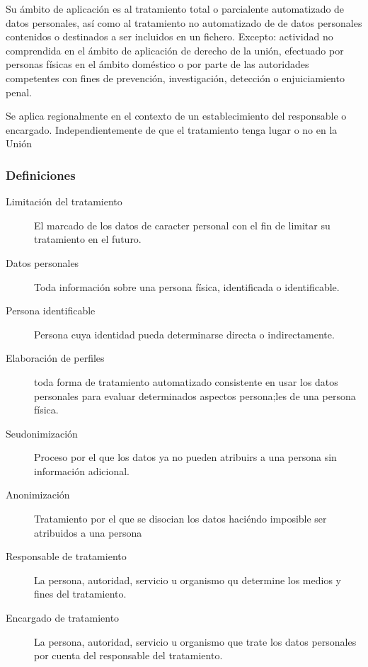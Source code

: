         Su ámbito de aplicación es al tratamiento total o parcialente automatizado de datos personales, así como al tratamiento no automatizado de de datos personales contenidos o destinados a ser incluidos en un fichero. Excepto: actividad no comprendida en el ámbito de aplicación de derecho de la unión, efectuado por personas físicas en el ámbito doméstico o por parte de las autoridades competentes con fines de prevención, investigación, detección o enjuiciamiento penal.

        Se aplica regionalmente en el contexto de un establecimiento del responsable o encargado. Independientemente de que el tratamiento tenga lugar o no en la Unión

    \subsubsection{Definiciones}
        \begin{description}
            \item[Limitación del tratamiento] El marcado de los datos de caracter personal con el fin de limitar su tratamiento en el futuro.
            \item[Datos personales] Toda información sobre una persona física, identificada o identificable.
            \item[Persona identificable] Persona cuya identidad pueda determinarse directa o indirectamente.
            \item[Elaboración de perfiles] toda forma de tratamiento automatizado consistente en usar los datos personales para evaluar determinados aspectos persona;les de una persona física.
            \item[Seudonimización] Proceso por el que los datos ya no pueden atribuirs a una persona sin información adicional.
            \item[Anonimización] Tratamiento por el que se disocian los datos haciéndo imposible ser atribuidos a una persona
            \item[Responsable de tratamiento] La persona, autoridad, servicio u organismo qu determine los medios y fines del tratamiento.
            \item[Encargado de tratamiento] La persona, autoridad, servicio u organismo que trate los datos personales por cuenta del responsable del tratamiento.     
        \end{description}

